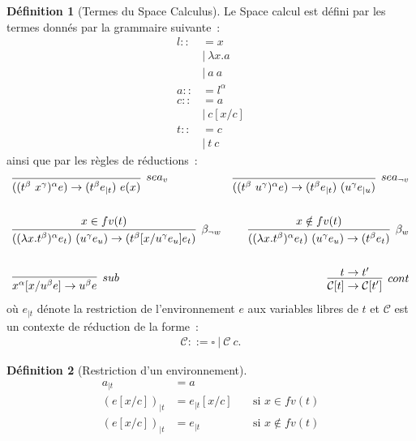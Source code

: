 \documentclass[11pt,a4paper]{article}
\theoremstyle{definition}
\newtheorem{definition}{Définition}[section]
\begin{document}
\begin{definition}[Termes du Space Calculus]
Le Space calcul est défini par les termes donnés par la grammaire suivante~:
\begin{align*}
    l ::&= x \\
    &|~\lambda x.a \\
    &|~a~a\\
    a ::&= l^{\alpha}\\
    c ::&= a\\
        &|~c[x/c]\\
    t ::&= c\\
        &|~t~c
\end{align*}
ainsi que par les règles de réductions~:
\begin{align*}
&\infer[sea_v]{((t^\beta~x^\gamma)^\alpha e) \rightarrow (t^\beta e_{|t})~e(x)}{}
&\infer[sea_{\neg v}]{((t^\beta~u^\gamma)^\alpha e) \rightarrow (t^\beta e_{|t})~(u^\gamma e_{|u}) }{}\\\\
&\infer[\beta_{\neg w}]{((\lambda x .t^\beta)^\alpha e_t)~(u^\gamma e_u ) \rightarrow (t^\beta[x/u^\gamma e_u]e_t)}{x \in fv(t) }
&\infer[\beta_w]{((\lambda x .t^\beta)^\alpha e_t)~(u^\gamma e_u ) \rightarrow (t^\beta e_t)}{x \notin fv(t) }\\\\
&\infer[sub]{x^\alpha[x/u^\beta e] \rightarrow u^\beta e}{}
&\infer[cont]{\mathcal{C}[t] \rightarrow \mathcal{C}[t']}{t\rightarrow t'}
\end{align*}
où $e_{|t}$ dénote la restriction de l'environnement $e$ aux variables libres de $t$ et 
$\mathcal{C}$ est un contexte de réduction de la forme~:
\begin{align*}
  \mathcal{C} ::= \square~|~\mathcal{C}~c.
\end{align*}

\end{definition}
\begin{definition}[Restriction d'un environnement]
\begin{align*}
a_{|t} &= a\\
    (e[x/c])_{|t} &= e_{|t}[x/c] \quad &\text{si } x\in fv(t)\\
    (e[x/c])_{|t} &= e_{|t} \quad &\text{si } x\notin fv(t)
\end{align*}
\end{definition}
\end{document}

